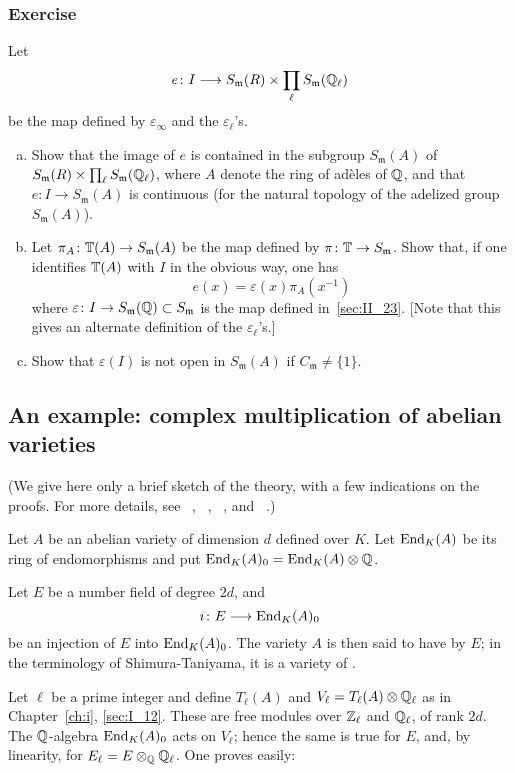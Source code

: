 \subsubsection*{Exercise}
Let 
\dpage
\[
	e \colon I \longrightarrow S_\mathfrak{m}(R) \times
	\prod_{\ell} S_\mathfrak{m}(\mathbb{Q}_\ell)
\]
be the map defined by $\varepsilon_\infty$ and the $\varepsilon_\ell$'s.
\begin{enumerate}[a)]
\item Show that the image of $e$ is contained in the subgroup
	$S_\mathfrak{m}(A)$ of $S_\mathfrak{m}(R) \times \prod_{\ell}
	S_\mathfrak{m}(\mathbb{Q}_\ell)$, where $A$ denote the ring of adèles of $\mathbb{Q}$,
	and that $e \colon I \to S_\mathfrak{m}(A)$ is continuous (for the
	natural topology of the adelized group $S_\mathfrak{m}(A)$).
\item Let $\pi_A \colon \mathbb{T}(A) \to S_\mathfrak{m}(A)$ be the map defined
	by $\pi \colon \mathbb{T} \to S_\mathfrak{m}$. Show that, if one
	identifies $\mathbb{T}(A)$ with $I$ in the obvious way, one has 
	\[
		e(x) = \varepsilon(x) \pi_A(x^{-1})
	\]
	where $\varepsilon \colon I \to S_\mathfrak{m}(\mathbb{Q}) \subset
	S_\mathfrak{m}$ is the map defined in~\ref{sec:II_23}. [Note that this
	gives an alternate definition of the $\varepsilon_\ell$'s.]
\item Show that $\varepsilon(I)$ is not open in $S_\mathfrak{m}(A)$ if
	$C_\mathfrak{m} \neq \{1\}$.
\end{enumerate}

\subsection{An example: complex multiplication of abelian varieties}
\label{sec:II_28}
(We give here only a brief sketch of the theory, with a few indications on the
proofs. For more details, see \citeauthor{34}~\cite{34},
\citeauthor{35}~\cite{35}, \citeauthor{41}~\cite{41}, \cite{42} and
\citeauthor{32}~\cite{32}.)

Let $A$ be an abelian variety of dimension $d$ defined over $K$.
Let $\operatorname{End}_K(A)$ be its ring of endomorphisms and put
$\operatorname{End}_K(A)_0 = \operatorname{End}_K(A) \otimes \mathbb{Q}$.

Let $E$ be a number field of degree $2d$, and
\dpage
\[
	i \colon E \longrightarrow \operatorname{End}_K(A)_0
\]
be an injection of $E$ into $\operatorname{End}_K(A)_0$. The variety $A$ is then said to
have  by $E$; in the terminology of
Shimura-Taniyama, it is a variety of .

Let $\ell$ be a prime integer and define $T_\ell(A)$ and $V_\ell = T_\ell(A)
\otimes \mathbb{Q}_\ell$ as in Chapter~\ref{ch:i}, \ref{sec:I_12}. These are free
modules over $\mathbb{Z}_\ell$ and $\mathbb{Q}_\ell$, of rank $2d$. The $\mathbb{Q}$-algebra
$\operatorname{End}_K(A)_0$ acts on $V_\ell$; hence the same is true for $E$, and, by
linearity, for $E_\ell = E \otimes_{\mathbb{Q}} \mathbb{Q}_\ell$. One proves easily:

